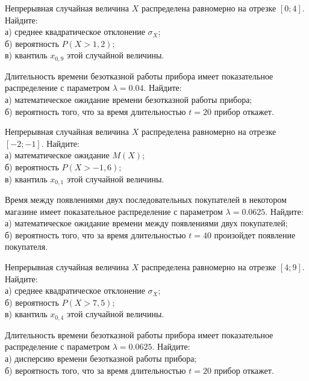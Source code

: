 \vfill

\newpage\setcounter{zad}{0}

\z Непрерывная случайная величина $X$ распределена равномерно на отрезке $[0; 4]$. Найдите: \\ \quad а) среднее квадратическое отклонение $\sigma_X$; \\ \quad б) вероятность $P(X>1{,}2)$; \\ \quad в) квантиль $x_{0{,}9}$ этой случайной величины.


\vfill

\z Длительность времени безотказной работы прибора имеет показательное распределение с параметром $\lambda = 0.04$. Найдите: \\ \quad а) математическое ожидание времени безотказной работы прибора; \\ \quad б) вероятность того, что за время длительностью $t = 20$ прибор  откажет.
 

\vfill

\newpage\setcounter{zad}{0}

\z Непрерывная случайная величина $X$ распределена равномерно на отрезке $[-2; -1]$. Найдите: \\ \quad а) математическое ожидание $M(X)$; \\ \quad б) вероятность $P(X>-1{,}6)$; \\ \quad в) квантиль $x_{0{,}1}$ этой случайной величины.


\vfill

\z Время между появлениями двух последовательных покупателей в некотором магазине имеет показательное распределение с параметром $\lambda = 0.0625$. Найдите: \\ \quad а) математическое ожидание времени между появлениями двух покупателей; \\ \quad б) вероятность того, что за время длительностью $t = 40$  произойдет появление покупателя.
 

\vfill

\newpage\setcounter{zad}{0}

\z Непрерывная случайная величина $X$ распределена равномерно на отрезке $[4; 9]$. Найдите: \\ \quad а) среднее квадратическое отклонение $\sigma_X$; \\ \quad б) вероятность $P(X>7{,}5)$; \\ \quad в) квантиль $x_{0{,}4}$ этой случайной величины.


\vfill

\z Длительность времени безотказной работы прибора имеет показательное распределение с параметром $\lambda = 0.0625$. Найдите: \\ \quad а) дисперсию времени безотказной работы прибора; \\ \quad б) вероятность того, что за время длительностью $t = 20$ прибор  откажет.
 

